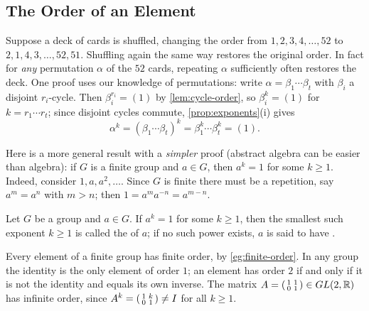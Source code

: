 \subsection{The Order of an Element}

\begin{eg}\label{eg:finite-order}
	Suppose a deck of cards is shuffled, changing the order from
	\(1, 2, 3, 4, \dots, 52\) to \(2, 1, 4, 3, \dots, 52, 51\). Shuffling again the same way
	restores the original order. In fact for \emph{any} permutation \(\alpha\) of the
	\(52\) cards, repeating \(\alpha\) sufficiently often restores the deck. One proof uses
	our knowledge of permutations: write \(\alpha = \beta_1\cdots\beta_t\) with \(\beta_i\)
	a disjoint \(r_i\)-cycle. Then \(\beta_i^{r_i} = (1)\) by
	\autoref{lem:cycle-order}, so \(\beta_i^k = (1)\) for \(k = r_1\cdots r_t\); since
	disjoint cycles commute, \autoref{prop:exponents}(i) gives
	\[
		\alpha^k = (\beta_1\cdots\beta_t)^k = \beta_1^k \cdots \beta_t^k = (1).
	\]

	Here is a more general result with a \emph{simpler} proof (abstract algebra can be
	easier than algebra): if \(G\) is a finite group and \(a \in G\), then \(a^k = 1\) for
	some \(k \geq 1\). Indeed, consider \(1, a, a^2, \dots\). Since \(G\) is finite there
	must be a repetition, say \(a^m = a^n\) with \(m > n\); then
	\(1 = a^m a^{-n} = a^{m-n}\).
\end{eg}

\begin{definition}
	Let \(G\) be a group and \(a \in G\). If \(a^k = 1\) for some \(k \geq 1\), then the
	smallest such exponent \(k \geq 1\) is called the  of \(a\); if no such
	power exists, \(a\) is said to have .
\end{definition}

Every element of a finite group has finite order, by \autoref{eg:finite-order}. In any
group the identity is the only element of order \(1\); an element has order \(2\) if and
only if it is not the identity and equals its own inverse. The matrix
\(A = \begin{psmallmatrix} 1&1 \\ 0&1\end{psmallmatrix} \in GL(2,\mathbb{R})\) has infinite
order, since \(A^k = \begin{psmallmatrix} 1&k \\ 0&1\end{psmallmatrix} \neq I\) for all
\(k \geq 1\).

